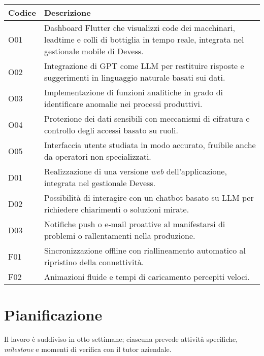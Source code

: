 \begin{center}
    \begin{tabular}{|p{2.25cm}|p{12.00cm}|}
    \hline
    \rowcolor{tableGray}\textbf{Codice} & \textbf{Descrizione} \\
    \hline
    O01 & Dashboard Flutter che visualizzi code dei macchinari, \gls{leadtime} e colli di bottiglia in tempo reale, integrata nel gestionale mobile di Devess.\\
    \hline
    O02 & Integrazione di GPT come \gls{LLM} per restituire risposte e suggerimenti in linguaggio naturale basati sui dati.\\
    \hline
    O03 & Implementazione di funzioni analitiche in grado di identificare anomalie nei processi produttivi.\\
    \hline
    O04 & Protezione dei dati sensibili con meccanismi di cifratura e controllo degli accessi basato su ruoli.\\
    \hline
    O05 & Interfaccia utente studiata in modo accurato, fruibile anche da operatori non specializzati.\\
    \hline
    D01 & Realizzazione di una versione \textit{web} dell’applicazione, integrata nel gestionale Devess.\\
    \hline
    D02 & Possibilità di interagire con un chatbot basato su \gls{LLM} per richiedere chiarimenti o soluzioni mirate.\\
    \hline
    D03 & Notifiche push o e‑mail proattive al manifestarsi di problemi o rallentamenti nella produzione.\\
    \hline
    F01 & Sincronizzazione offline con riallineamento automatico al ripristino della connettività.\\
    \hline
    F02 & Animazioni fluide e tempi di caricamento percepiti veloci.\\
    \hline
    \end{tabular}
    \label{tab:requisiti_obbiettivi}
\end{center}

\section{Pianificazione}
\label{subsec:pianificazione}

Il lavoro è suddiviso in otto settimane; ciascuna prevede attività specifiche, \textit{milestone} e momenti di verifica con il tutor aziendale.


